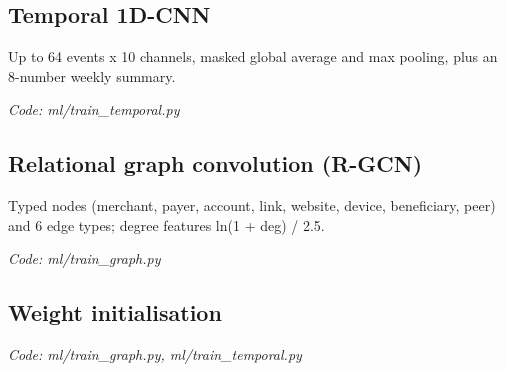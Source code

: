 \documentclass[11pt,a4paper]{article}
\newcommand{\where}[1]{\par{\small\itshape\color{mute}Code: #1}\par}
\begin{document}
\subsection*{Temporal 1D-CNN}
\par\smallskip\noindent{}\par\smallskip
\par\smallskip\noindent{}\par\smallskip
Up to 64 events x 10 channels, masked global average and max pooling, plus an 8-number weekly summary.
\where{ml/train\_temporal.py}

\subsection*{Relational graph convolution (R-GCN)}
\par\smallskip\noindent{}\par\smallskip
\par\smallskip\noindent{}\par\smallskip
Typed nodes (merchant, payer, account, link, website, device, beneficiary, peer) and 6 edge types; degree features ln(1 + deg) / 2.5.
\where{ml/train\_graph.py}

\subsection*{Weight initialisation}
\par\smallskip\noindent{}\par\smallskip
\where{ml/train\_graph.py, ml/train\_temporal.py}
\end{document}
